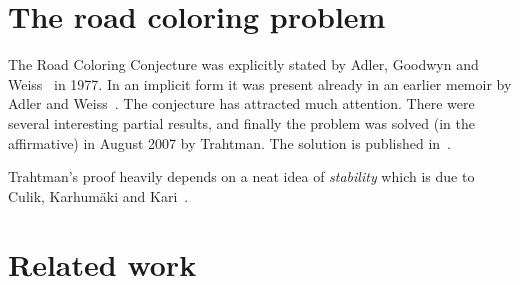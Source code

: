 \documentclass{irmaart}
\theoremstyle{plain}
\begin{document}
\section{The road coloring problem}
\label{KV:sec:rcp}

The Road Coloring Conjecture was explicitly stated by Adler,
Goodwyn and Weiss~\cite{Adler&Goodwyn&Weiss:1977} in 1977. In an
implicit form it was present already in an earlier memoir by Adler
and Weiss~\cite{Adler&Weiss:1970}. The conjecture has attracted
much attention. There were several interesting partial results,
and finally the problem was solved (in the affirmative) in August
2007 by Trahtman. The solution is published
in~\cite{Trahtman:2009}.

Trahtman's proof heavily depends on a neat idea of
\emph{stability} which is due to Culik, Karhum\"aki and
Kari~\cite{Culik&Karhumaki&Kari:2002}.


\section{Related work}
\label{KV:sec:related}


\begin{footnotesize}
  
\end{footnotesize}


\markright{\indexname}\markboth{\indexname}{\indexname}
\printindex
\end{document}
